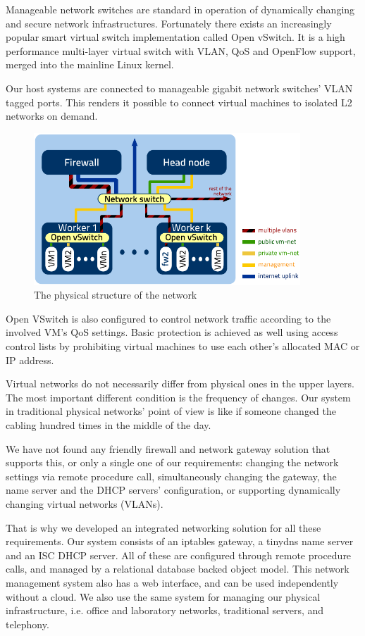 \documentclass{llncs}
\begin{document}
Manageable network switches are standard in operation of dynamically changing and secure network infrastructures. Fortunately there exists an increasingly popular smart virtual switch implementation called Open vSwitch.\cite{pfaff2009extending} It is a high performance multi-layer virtual switch with VLAN, QoS and OpenFlow support, merged into the mainline Linux kernel.

Our host systems are connected to manageable gigabit network switches' VLAN tagged ports. This renders it possible to connect virtual machines to isolated L2 networks on demand.


  \begin{figure}[ht]
      \centering
      \includegraphics[width=10cm]{netarch}
      \caption{The physical structure of the network}
  \end{figure}



Open VSwitch is also configured to control network traffic according to the involved VM's QoS settings. Basic protection is achieved as well using access control lists by prohibiting virtual machines to use each other's allocated MAC or IP address.

Virtual networks do not necessarily differ from physical ones in the upper layers. The most important different condition is the frequency of changes. Our system in traditional physical networks' point of view is like if someone changed the cabling hundred times in the middle of the day.

We have not found any friendly firewall and network gateway solution that supports this, or only a single one of our requirements: changing the network settings via remote procedure call, simultaneously changing the gateway, the name server and the DHCP servers' configuration, or supporting dynamically changing virtual networks (VLANs).

That is why we developed an integrated networking solution for all these requirements. Our system consists of an iptables gateway, a tinydns name server and an ISC DHCP server. All of these are configured through remote procedure calls, and managed by a relational database backed object model. This network management system also has a web interface, and can be used independently without a cloud. We also use the same system for managing our physical infrastructure, i.e. office and laboratory networks, traditional servers, and telephony.
\end{document}
